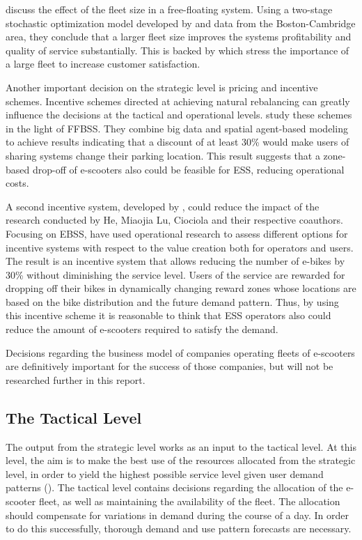 \citet{he_operations_2019} discuss the effect of the fleet size in a free-floating system. Using a two-stage stochastic optimization model developed by \citet{lu_optimizing_2017} and data from the Boston-Cambridge area, they conclude that a larger fleet size improves the systems profitability and quality of service substantially. This is backed by \citet{ciociola_e-scooter_2020} which stress the importance of a large fleet to increase customer satisfaction.

Another important decision on the strategic level is pricing and incentive schemes. Incentive schemes directed at achieving natural rebalancing can greatly influence the decisions at the tactical and operational levels. \citet{lu_considering_2019} study these schemes in the light of FFBSS. They combine big data and spatial agent-based modeling to achieve results indicating that a discount of at least 30\% would make users of sharing systems change their parking location. This result suggests that a zone-based drop-off of e-scooters also could be feasible for ESS, reducing operational costs. 

A second incentive system, developed by \citet{heitz_designing_2020}, could reduce the impact of the research conducted by He, Miaojia Lu, Ciociola and their respective coauthors. Focusing on EBSS, \citet{heitz_designing_2020} have used operational research to assess different options for incentive systems with respect to the value creation both for operators and users. The result is an incentive system that allows reducing the number of e-bikes by 30\% without diminishing the service level. Users of the service are rewarded for dropping off their bikes in dynamically changing reward zones whose locations are based on the bike distribution and the future demand pattern. Thus, by using this incentive scheme it is reasonable to think that ESS operators also could reduce the amount of e-scooters required to satisfy the demand. 

Decisions regarding the business model of companies operating fleets of e-scooters are definitively important for the success of those companies, but will not be researched further in this report. 

\subsection{The Tactical Level}

The output from the strategic level works as an input to the tactical level. At this level, the aim is to make the best use of the resources allocated from the strategic level, in order to yield the highest possible service level given user demand patterns (\cite{paias_service_2016}). The tactical level contains decisions regarding the allocation of the e-scooter fleet, as well as maintaining the availability of the fleet. The allocation should compensate for variations in demand during the course of a day. In order to do this successfully, thorough demand and use pattern forecasts are necessary. 


